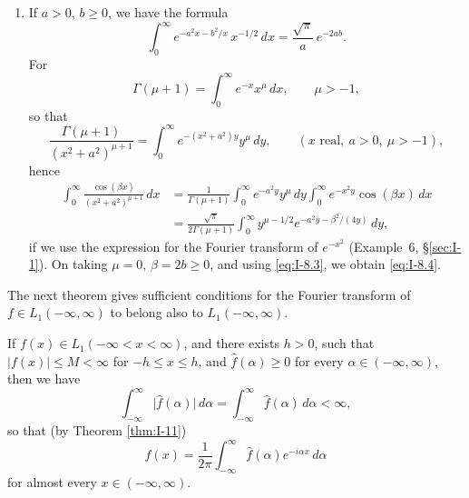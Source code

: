 \begin{enumerate}[label=\arabic*.,ref=\arabic*]
\item If $a>0$, $b\ge 0$, we have the formula
\begin{equation}\label{eq:I-8.4}\tag{8.4}
\int_{0}^{\infty}e^{-a^{2}x-b^{2}/x}\,x^{-1/2}\,dx=\frac{\sqrt{\pi}}{a}\,e^{-2ab}.
\end{equation}
For
\begin{equation*}
\Gamma(\mu+1)=\int_{0}^{\infty}e^{-x}x^{\mu}\,dx,\qquad\mu>-1,
\end{equation*}
so that
\begin{equation*}
\frac{\Gamma(\mu+1)}{(x^{2}+a^{2})^{\mu+1}}
=\int_{0}^{\infty}e^{-(x^{2}+a^{2})y}y^{\mu}\,dy,\qquad(x\text{ real},\ a>0,\ \mu>-1),
\end{equation*}
hence
\begin{equation*}
\begin{aligned}
\int_{0}^{\infty}\frac{\cos(\beta x)}{(x^{2}+a^{2})^{\mu+1}}\,dx &= \frac{1}{\Gamma(\mu+1)}\int_{0}^{\infty}e^{-a^{2}y}y^{\mu}\,dy\int_{0}^{\infty}e^{-x^{2}y}\cos(\beta x)\,dx\\
&= \frac{\sqrt{\pi}}{2\Gamma(\mu+1)}\int_{0}^{\infty}y^{\mu-1/2}e^{-a^{2}y-\beta^{2}/(4y)}\,dy,
\end{aligned}
\end{equation*}
if we use the expression for the Fourier transform of $e^{-x^{2}}$ (Example~6, \S\ref{sec:I-1}). On taking $\mu=0$, $\beta=2b\ge 0$, and using \eqref{eq:I-8.3}, we obtain \eqref{eq:I-8.4}.
\end{enumerate}

The next theorem gives sufficient conditions for the Fourier transform of $f\in L_1(-\infty,\infty)$ to belong also to $L_1(-\infty,\infty)$.

\begin{theorem}\label{thm:I-12}
If $f(x)\in L_1(-\infty<x<\infty)$, and there exists $h>0$, such that $|f(x)|\le M<\infty$ for $-h\le x\le h$, and $\widehat f(\alpha)\ge 0$ for every $\alpha\in(-\infty,\infty)$, then we have
\begin{equation*}
\int_{-\infty}^{\infty}\bigl|\widehat f(\alpha)\bigr|\,d\alpha
=\int_{-\infty}^{\infty}\widehat f(\alpha)\,d\alpha<\infty,
\end{equation*}
so that (by Theorem \ref{thm:I-11})
\begin{equation*}
f(x)=\frac{1}{2\pi}\int_{-\infty}^{\infty}\widehat f(\alpha)e^{-i\alpha x}\,d\alpha
\end{equation*}
for almost every $x\in(-\infty,\infty)$.
\end{theorem}

